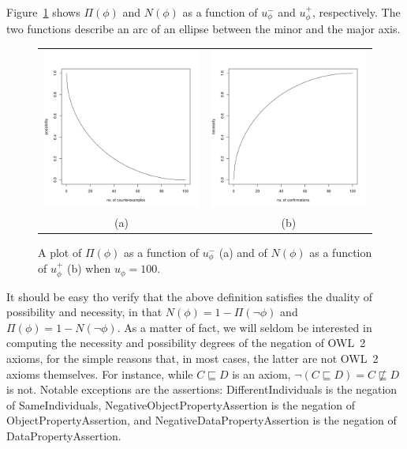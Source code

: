 \documentclass[a4paper]{article}
\newcounter{ex}
\begin{document}
Figure~\ref{fig:poss-nec-plots} shows $\Pi(\phi)$ and $N(\phi)$ as a function of
$u_\phi^-$ and $u_\phi^+$, respectively. The two functions describe an arc of
an ellipse between the minor and the major axis.

\begin{figure}
  \begin{center}
    \begin{tabular}{cc}
      \includegraphics[width=2.5in]{possibility} &
      \includegraphics[width=2.5in]{necessity} \\
      (a) & (b)
    \end{tabular}
  \end{center}
  \caption{A plot of $\Pi(\phi)$  as a function of
    $u_\phi^-$ (a) and of $N(\phi)$ as a function of
    $u_\phi^+$ (b) when $u_\phi = 100$.\label{fig:poss-nec-plots}}
\end{figure}

It should be easy tho verify that the above definition satisfies the duality of
possibility and necessity, in that $N(\phi) = 1 - \Pi(\neg\phi)$ and
$\Pi(\phi) = 1 - N(\neg\phi)$.
As a matter of fact, we will seldom be interested in computing the necessity and
possibility degrees of the negation of OWL~2 axioms, for the simple reasons that, in most cases,
the latter are not OWL~2 axioms themselves. For instance, while $C \sqsubseteq D$
is an axiom, $\neg(C \sqsubseteq D) = C \not\sqsubseteq D$ is not.
Notable exceptions are the assertions: \textsf{DifferentIndividuals} is the
negation of \textsf{SameIndividuals}, \textsf{NegativeObjectPropertyAssertion}
is the negation of \textsf{ObjectPropertyAssertion}, and
\textsf{NegativeDataPropertyAssertion} is the negation of \textsf{DataPropertyAssertion}.
\end{document}
